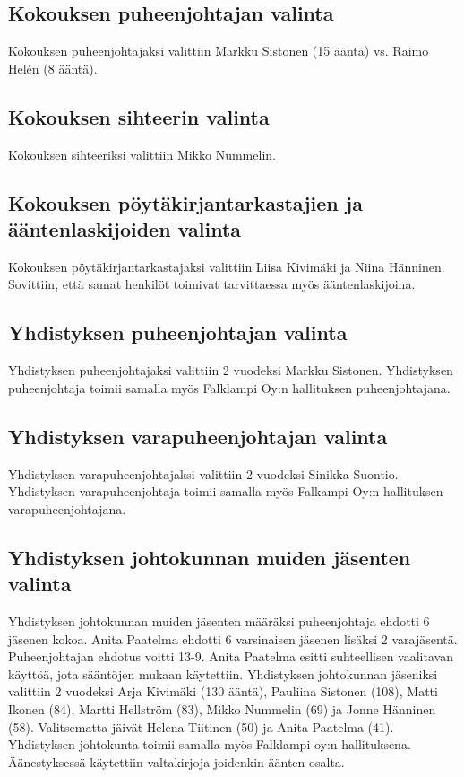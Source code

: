\documentclass[a4paper,12pt]{article}
\begin{document}
\subsection{Kokouksen puheenjohtajan valinta}
Kokouksen puheenjohtajaksi valittiin Markku Sistonen (15 ääntä) vs. Raimo Helén (8 ääntä).
\subsection{Kokouksen sihteerin valinta}
Kokouksen sihteeriksi valittiin Mikko Nummelin.
\subsection{Kokouksen pöytäkirjantarkastajien ja ääntenlaskijoiden valinta}
Kokouksen pöytäkirjantarkastajaksi valittiin Liisa Kivimäki ja Niina Hänninen. Sovittiin, että samat henkilöt toimivat tarvittaessa myös ääntenlaskijoina.
\subsection{Yhdistyksen puheenjohtajan valinta}
Yhdistyksen puheenjohtajaksi valittiin 2 vuodeksi Markku Sistonen. Yhdistyksen puheenjohtaja toimii samalla myös Falklampi Oy:n hallituksen puheenjohtajana.
\subsection{Yhdistyksen varapuheenjohtajan valinta}
Yhdistyksen varapuheenjohtajaksi valittiin 2 vuodeksi Sinikka Suontio. Yhdistyksen varapuheenjohtaja toimii samalla myös Falkampi Oy:n hallituksen varapuheenjohtajana.
\subsection{Yhdistyksen johtokunnan muiden jäsenten valinta}
Yhdistyksen johtokunnan muiden jäsenten määräksi puheenjohtaja ehdotti 6 jäsenen kokoa. Anita Paatelma ehdotti 6 varsinaisen jäsenen lisäksi 2 varajäsentä. Puheenjohtajan ehdotus voitti 13-9. Anita Paatelma esitti suhteellisen vaalitavan käyttöä, jota sääntöjen mukaan käytettiin. Yhdistyksen johtokunnan jäseniksi valittiin 2 vuodeksi Arja Kivimäki (130 ääntä), Pauliina Sistonen (108), Matti Ikonen (84), Martti Hellström (83), Mikko Nummelin (69) ja Jonne Hänninen (58). Valitsematta jäivät Helena Tiitinen (50) ja Anita Paatelma (41). Yhdistyksen johtokunta toimii samalla myös Falklampi oy:n hallituksena. Äänestyksessä käytettiin valtakirjoja joidenkin äänten osalta.
\end{document}
